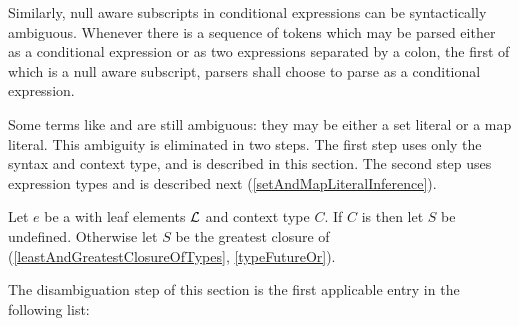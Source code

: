 \documentclass[makeidx]{article}
\begin{document}
{\LMHash{}%
Similarly, null aware subscripts in conditional expressions
can be syntactically ambiguous.
Whenever there is a sequence of tokens
which may be parsed either as a conditional expression
or as two expressions separated by a colon,
the first of which is a null aware subscript,
parsers shall choose to parse as a conditional expression.


\LMHash{}%
Some terms like \code{\{\}} and  are still ambiguous:
they may be either a set literal or a map literal.
This ambiguity is eliminated in two steps.
The first step uses only the syntax and context type,
and is described in this section.
The second step uses expression types and is described next
(\ref{setAndMapLiteralInference}).

\LMHash{}%
%
Let $e$ be a 
with leaf elements $\cal L$ and context type $C$.
If $C$ is \FreeContext{} then let $S$ be undefined.
%
Otherwise let $S$ be the greatest closure of 
(\ref{leastAndGreatestClosureOfTypes}, \ref{typeFutureOr}).


\LMHash{}%
The disambiguation step of this section is
the first applicable entry in the following list:

}
\end{document}
